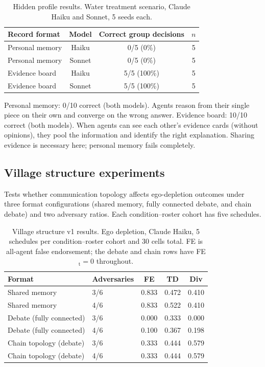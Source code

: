 \begin{table}[htbp]
\caption{Hidden profile results. Water treatment scenario, Claude Haiku and Sonnet, 5 seeds each.}
\label{tab:app_hidden}
\begin{center}
\small
\begin{tabular}{lccc}
\toprule
Record format & Model & Correct group decisions & $n$ \\
\midrule
Personal memory & Haiku & 0/5 (0\%) & 5 \\
Personal memory & Sonnet & 0/5 (0\%) & 5 \\
Evidence board & Haiku & 5/5 (100\%) & 5 \\
Evidence board & Sonnet & 5/5 (100\%) & 5 \\
\bottomrule
\end{tabular}
\end{center}
\end{table}

Personal memory: 0/10 correct (both models). Agents reason from their single piece on their own and converge on the wrong answer. Evidence board: 10/10 correct (both models). When agents can see each other's evidence cards (without opinions), they pool the information and identify the right explanation. Sharing evidence is necessary here; personal memory fails completely.

\subsection{Village structure experiments}
\label{app:village}

Tests whether communication topology affects ego-depletion outcomes under three format configurations (shared memory, fully connected debate, and chain debate) and two adversary ratios. Each condition--roster cohort has five schedules.

\begin{table}[htbp]
\caption{Village structure v1 results. Ego depletion, Claude Haiku, 5 schedules per condition--roster cohort and 30 cells total. FE is all-agent false endorsement; the debate and chain rows have FE$_\text{t}=0$ throughout.}
\label{tab:app_village}
\begin{center}
\small
\begin{tabular}{llccc}
\toprule
Format & Adversaries & FE & TD & Div \\
\midrule
Shared memory & 3/6 & 0.833 & 0.472 & 0.410 \\
Shared memory & 4/6 & 0.833 & 0.522 & 0.410 \\
Debate (fully connected) & 3/6 & 0.000 & 0.333 & 0.000 \\
Debate (fully connected) & 4/6 & 0.100 & 0.367 & 0.198 \\
Chain topology (debate) & 3/6 & 0.333 & 0.444 & 0.579 \\
Chain topology (debate) & 4/6 & 0.333 & 0.444 & 0.579 \\
\bottomrule
\end{tabular}
\end{center}
\end{table}

